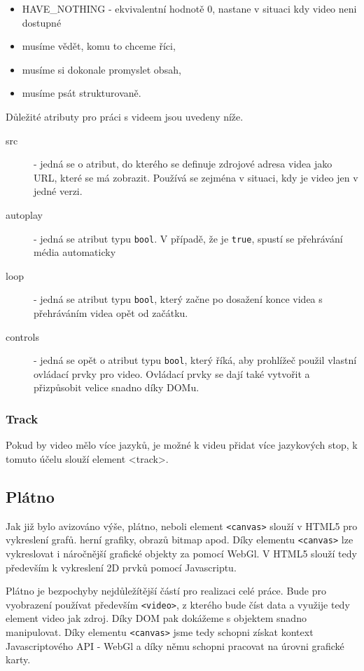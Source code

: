 \begin{itemize}
	\item HAVE\_NOTHING - ekvivalentní hodnotě 0, nastane v situaci kdy video neni dostupné
	\item musíme vědět, komu to chceme říci,
	\item musíme si dokonale promyslet obsah,
	\item musíme psát strukturovaně. 
\end{itemize}


Důležité atributy pro práci s videem jsou uvedeny níže.

\begin{description}
	\item[src]  - jedná se o atribut, do kterého se definuje zdrojové adresa videa jako URL, které se má zobrazit. Používá se zejména v situaci, kdy je video jen v jedné verzi.
	\item[autoplay]  - jedná se atribut typu \texttt{bool}. V případě, že je \texttt{true}, spustí se přehrávání média automaticky	
	\item[loop]  - jedná se atribut typu \texttt{bool}, který začne po dosažení konce videa s přehráváním videa opět od začátku.
	\item[controls]  - jedná se opět o atribut typu \texttt{bool}, který říká, aby prohlížeč použil vlastní ovládací prvky pro video. Ovládací prvky se dají také vytvořit a přizpůsobit velice snadno díky DOMu.
 
\end{description}

\subsubsection{Track}
Pokud by video  mělo více jazyků, je možné k videu přidat více jazykových stop, k tomuto účelu slouží element <track>.

\newpage

\subsection{Plátno}
Jak již bylo avizováno výše, plátno, neboli element \texttt{<canvas>} slouží v HTML5 pro vykreslení grafů. herní grafiky, obrazů bitmap apod. Díky elementu \texttt{<canvas>} lze vykreslovat i náročnější grafické objekty za pomocí WebGl. V HTML5 slouží tedy především k vykreslení 2D prvků pomocí Javascriptu.

Plátno je bezpochyby nejdůležítější částí pro realizaci celé práce. Bude pro vyobrazení používat především \texttt{<video>}, z kterého bude číst data a využije tedy element video jak zdroj. Díky DOM pak dokážeme s objektem snadno manipulovat. Díky elementu \texttt{<canvas>} jsme tedy schopni získat kontext Javascriptového API - WebGl a díky němu schopni pracovat na úrovni grafické karty.

